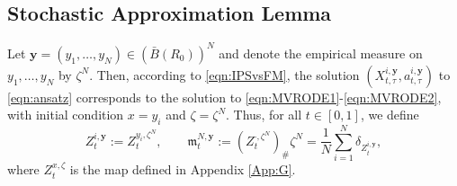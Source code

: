 \documentclass{article}
\begin{document}
\begin{appendices}
\section{Stochastic Approximation Lemma}\label{App:I}
Let $\bm{y}=(y_1,\ldots,y_N)\in (\bar B(R_0))^N$ and denote the empirical measure on $y_1,\ldots ,y_N$ by $\zeta^N$. Then, according to \eqref{eqn:IPSvsFM}, the solution $(X^{i,\bm{y}}_{t,\tau},a^{i,\bm{y}}_{t,\tau})$ to \eqref{eqn:ansatz} corresponds to the solution to \eqref{eqn:MVRODE1}-\eqref{eqn:MVRODE2}, with initial condition $x=y_i$ and $\zeta=\zeta^N$. Thus, for all $t\in[0,1]$, we define 
\[
Z^{i,\bm{y}}_t := Z^{y_i,\zeta^N}_t, \qquad \mathfrak{m}^{N,\bm{y}}_t := (Z^{\cdot,\zeta^N}_t)_\#\zeta^{N}= \frac{1}{N}\sum_{i=1}^N\delta_{Z^{i,\bm{y}}_t},
\]
where $Z^{x,\zeta}_t$ is the map defined in Appendix \ref{App:G}. 


\end{appendices}
\end{document}

